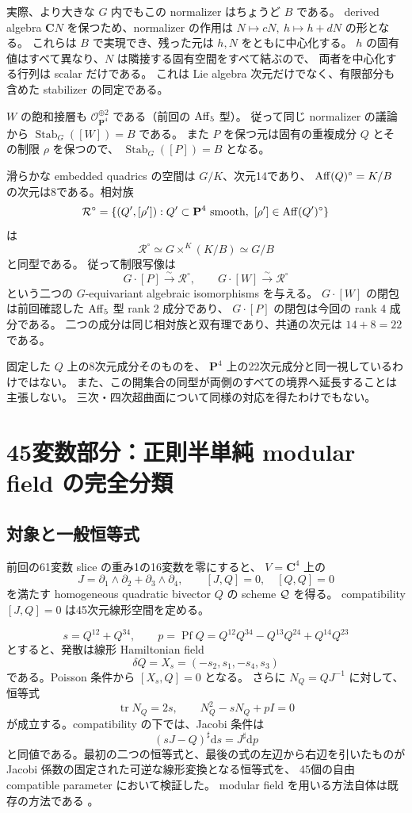 \documentclass[11pt,a4paper]{ltjsarticle}
\newcommand{\PP}{\mathbf P}\renewcommand{\AA}{\mathbf A}\newcommand{\CC}{\mathbf C}\newcommand{\QQ}{\mathbf Q}
\newcommand{\OO}{\mathcal O}\newcommand{\FF}{\mathcal F}\newcommand{\cP}{\mathcal P}\newcommand{\dd}{\mathrm d}
\DeclareMathOperator{\Pf}{Pf}\DeclareMathOperator{\PGL}{PGL}\DeclareMathOperator{\GL}{GL}
\DeclareMathOperator{\Stab}{Stab}\DeclareMathOperator{\tr}{tr}\DeclareMathOperator{\Span}{span}
\theoremstyle{remark}\newtheorem{remark}[theorem]{注意}\renewcommand{\proofname}{証明}
\begin{document}
実際、より大きな $G$ 内でもこの normalizer はちょうど $B$ である。
derived algebra $\CC N$ を保つため、normalizer の作用は
$N\mapsto cN,\ h\mapsto h+dN$ の形となる。
これらは $B$ で実現でき、残った元は $h,N$ をともに中心化する。
$h$ の固有値はすべて異なり、$N$ は隣接する固有空間をすべて結ぶので、
両者を中心化する行列は scalar だけである。
これは Lie algebra 次元だけでなく、有限部分も含めた stabilizer の同定である。

$W$ の飽和接層も $\OO_{\PP^4}^{\oplus2}$ である（前回の $\operatorname{Aff}_5$ 型）。
従って同じ normalizer の議論から $\Stab_G([W])=B$ である。
また $P$ を保つ元は固有の重複成分 $Q$ とその制限 $\rho$ を保つので、
$\Stab_G([P])=B$ となる。

滑らかな embedded quadrics の空間は $G/K$、次元14であり、
$\operatorname{Aff}(Q)^\circ=K/B$ の次元は8である。相対族
\[
 \mathcal R^\circ=
 \{(Q',[\rho']):Q'\subset\PP^4\text{ smooth},
       \ [\rho']\in\Aff(Q')^\circ\}
\]
は
\begin{equation}\label{eq:relative}
 \mathcal R^\circ\simeq G\times^K(K/B)\simeq G/B
\end{equation}
と同型である。
従って制限写像は
\[
 G\cdot[P]\xrightarrow{\sim}\mathcal R^\circ,\qquad
 G\cdot[W]\xrightarrow{\sim}\mathcal R^\circ
\]
という二つの $G$-equivariant algebraic isomorphisms を与える。
$G\cdot[W]$ の閉包は前回確認した $\operatorname{Aff}_5$ 型 rank 2 成分であり、
$G\cdot[P]$ の閉包は今回の rank 4 成分である。
二つの成分は同じ相対族と双有理であり、共通の次元は $14+8=22$ である。

固定した $Q$ 上の8次元成分そのものを、
$\PP^4$ 上の22次元成分と同一視しているわけではない。
また、この開集合の同型が両側のすべての境界へ延長することは主張しない。
三次・四次超曲面について同様の対応を得たわけでもない。

\section{45変数部分：正則半単純 modular field の完全分類}\label{sec:rs}
\subsection{対象と一般恒等式}
前回の61変数 slice の重み1の16変数を零にすると、
$V=\CC^4$ 上の
\[
 J=\partial_1\wedge\partial_2+\partial_3\wedge\partial_4,\qquad
 [J,Q]=0,\quad [Q,Q]=0
\]
を満たす homogeneous quadratic bivector $Q$ の scheme $\mathcal Q$ を得る。
compatibility $[J,Q]=0$ は45次元線形空間を定める。

\[
 s=Q^{12}+Q^{34},\qquad
 p=\Pf Q=Q^{12}Q^{34}-Q^{13}Q^{24}+Q^{14}Q^{23}
\]
とすると、発散は線形 Hamiltonian field
\[
 \delta Q=X_s=(-s_2,s_1,-s_4,s_3)
\]
である。Poisson 条件から $[X_s,Q]=0$ となる。
さらに $N_Q=QJ^{-1}$ に対して、恒等式
\[
 \tr N_Q=2s,\qquad N_Q^2-sN_Q+pI=0
\]
が成立する。compatibility の下では、Jacobi 条件は
\[
 (sJ-Q)^\sharp\dd s=J^\sharp\dd p
\]
と同値である。最初の二つの恒等式と、最後の式の左辺から右辺を引いたものが
Jacobi 係数の固定された可逆な線形変換となる恒等式を、
45個の自由 compatible parameter において検証した。
modular field を用いる方法自体は既存の方法である \cite{Klinker}。
\end{document}
